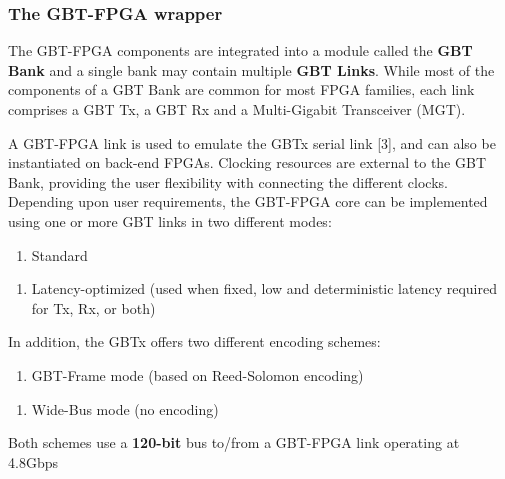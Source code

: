 \subsubsection{The GBT-FPGA wrapper}
The GBT-FPGA components are integrated into a module called the \textbf{GBT Bank} and a single bank may contain multiple \textbf{GBT Links}. While most of the components of a GBT Bank are common for most FPGA families, each link comprises a GBT Tx, a GBT Rx and a Multi-Gigabit Transceiver (MGT). 

A GBT-FPGA link is used to emulate the GBTx serial link [3], and can also be instantiated on back-end FPGAs. Clocking resources are external to the GBT Bank, providing the user flexibility with connecting the different clocks. Depending upon user requirements, the GBT-FPGA core can be implemented using one or more GBT links in two different modes:
\begin{enumerate}
\item Standard 
\end{enumerate}
\begin{enumerate}
\item Latency-optimized (used when fixed, low and deterministic latency required for Tx, Rx, or both)
\end{enumerate}
In addition, the GBTx offers two different encoding schemes:
\begin{enumerate}
\item GBT-Frame mode (based on Reed-Solomon encoding)
\end{enumerate}
\begin{enumerate}
\item Wide-Bus mode (no encoding)
\end{enumerate}
Both schemes use a \textbf{120-bit} bus to/from a GBT-FPGA link operating at 4.8Gbps
